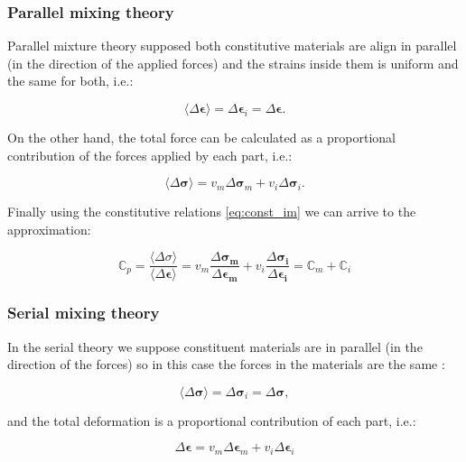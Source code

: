 \documentclass[3p]{elsarticle}
\begin{document}
\subsubsection{Parallel mixing theory}

Parallel mixture theory supposed both constitutive materials are align in parallel (in the
direction of the applied forces) and the
strains inside them is uniform and the same for both, i.e.:

\begin{equation}
\langle\Delta \bm{\epsilon}\rangle = \Delta \bm{\epsilon}_i = \Delta \bm{\epsilon}.
\end{equation}

\noindent
On the other hand, the total force can be calculated as a proportional
contribution of the forces applied by each part, i.e.:

\begin{equation}
\langle\Delta \bm{\sigma}\rangle  = v_m \Delta \bm{\sigma}_m + v_i \Delta \bm{\sigma}_i.
\end{equation}

Finally using the constitutive relations \ref{eq:const_im} we can arrive to the
approximation:

\begin{equation}
\mathbb{C}_p = \frac{\langle\Delta \sigma\rangle}{\langle\Delta \bm{\epsilon}\rangle} = 
v_m\frac{\Delta \bm{\sigma_m}}{\Delta \bm{\epsilon_m}} +
v_i\frac{\Delta \bm{\sigma_i}}{\Delta \bm{\epsilon_i}} = 
\mathbb{C}_m + \mathbb{C}_i
\label{eq:parallel_mix}
\end{equation}


\subsubsection{Serial mixing theory}
In the serial theory we suppose constituent materials are in 
parallel (in the direction of the forces) so in
this case the forces in the materials are the same :

\begin{equation}
\langle \Delta \bm{\sigma} \rangle= \Delta \bm{\sigma}_i = \Delta \bm{\sigma},
\end{equation}

\noindent
and the total deformation is a proportional contribution of each part, i.e.:

\begin{equation}
\Delta \bm{\epsilon} = v_m \Delta \bm{\epsilon}_m + v_i \Delta \bm{\epsilon}_i
\end{equation}
\end{document}
